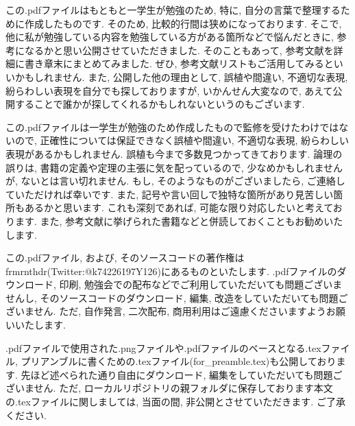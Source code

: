 \documentclass[a4paper]{jsarticle}
\begin{document}
この.pdfファイルはもともと一学生が勉強のため, 特に, 自分の言葉で整理するために作成したものです. そのため, 比較的行間は狭めになっております. そこで, 他に私が勉強している内容を勉強している方がある箇所などで悩んだときに, 参考になるかと思い公開させていただきました. そのこともあって, 参考文献を詳細に書き章末にまとめてみました. ぜひ, 参考文献リストもご活用してみるといいかもしれません. また, 公開した他の理由として, 誤植や間違い, 不適切な表現, 紛らわしい表現を自分でも探しておりますが, いかんせん大変なので, あえて公開することで誰かが探してくれるかもしれないというのもございます. \par
この.pdfファイルは一学生が勉強のため作成したもので監修を受けたわけではないので, 正確性については保証できなく誤植や間違い, 不適切な表現, 紛らわしい表現があるかもしれません. 誤植も今まで多数見つかってきております. 論理の誤りは, 書籍の定義や定理の主張に気を配っているので, 少なめかもしれませんが, ないとは言い切れません. もし, そのようなものがございましたら, ご連絡していただければ幸いです. また, 記号や言い回しで独特な箇所があり見苦しい箇所もあるかと思います. これも深刻であれば, 可能な限り対応したいと考えております. また, 参考文献に挙げられた書籍などと併読しておくこともお勧めいたします. \par
この.pdfファイル, および, そのソースコードの著作権はfrmrnthdr(Twitter:@k74226197Y126)にあるものといたします. .pdfファイルのダウンロード, 印刷, 勉強会での配布などでご利用していただいても問題ございませんし, そのソースコードのダウンロード, 編集, 改造をしていただいても問題ございません. ただ, 自作発言, 二次配布, 商用利用はご遠慮くださいますようお願いいたします. \par
.pdfファイルで使用された.pngファイルや.pdfファイルのベースとなる.texファイル, プリアンブルに書くための.texファイル(for\_preamble.tex)も公開しております. 先ほど述べられた通り自由にダウンロード, 編集をしていただいても問題ございません. ただ, ローカルリポジトリの親フォルダに保存しております本文の.texファイルに関しましては, 当面の間, 非公開とさせていただきます. ご了承ください. 
\end{document}
